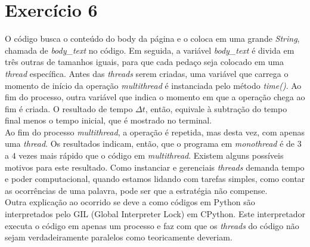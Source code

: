 \documentclass[a4paper,12pt]{article}
\begin{document}
\section{Exercício 6}
O código busca o conteúdo do body da página e o coloca em uma grande \textit{String}, chamada de \textit{body\_text} no código.
Em seguida, a variável \textit{body\_text} é divida em três outras de tamanhos iguais, para que cada pedaço seja colocado em uma \textit{thread} específica. Antes das \textit{threads} serem criadas, uma variável que carrega o momento de início da operação \textit{multithread} é instanciada pelo método \textit{time()}. 
Ao fim do processo, outra variável que indica o momento em que a operação chega ao fim é criada. O resultado de tempo $\Delta t$, então, equivale à subtração do tempo final menos o tempo inicial, que é mostrado no terminal.\\
Ao fim do processo \textit{multithread}, a operação é repetida, mas desta vez, com apenas uma \textit{thread}. Os resultados indicam, então, que o programa em \textit{monothread} é de $3$ a $4$ vezes mais rápido que o código em \textit{multithread}.
Existem alguns possíveis motivos para este resultado. Como instanciar e gerenciais \textit{threads} demanda tempo e poder computacional, quando estamos lidando com tarefas simples, como contar as ocorrências de uma palavra, pode ser que a estratégia não compense.\\
Outra explicação ao ocorrido se deve a como códigos em Python são interpretados pelo GIL (Global Interpreter Lock) em CPython. Este interpretador executa o código em apenas um processo e faz com que os \textit{threads} do código não sejam verdadeiramente paralelos como teoricamente deveriam.
\end{document}
